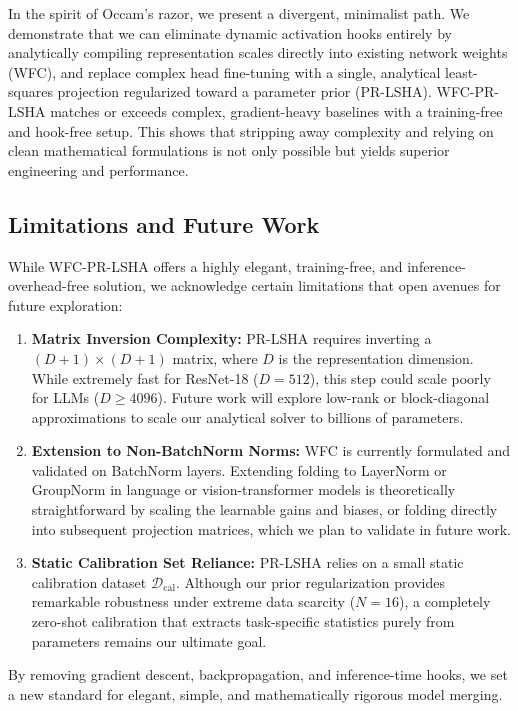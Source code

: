 \documentclass{article}
\theoremstyle{plain}
\theoremstyle{definition}
\theoremstyle{remark}
\begin{document}
In the spirit of Occam's razor, we present a divergent, minimalist path. We demonstrate that we can eliminate dynamic activation hooks entirely by analytically compiling representation scales directly into existing network weights (WFC), and replace complex head fine-tuning with a single, analytical least-squares projection regularized toward a parameter prior (PR-LSHA). WFC-PR-LSHA matches or exceeds complex, gradient-heavy baselines with a training-free and hook-free setup. This shows that stripping away complexity and relying on clean mathematical formulations is not only possible but yields superior engineering and performance.

\subsection{Limitations and Future Work}
\label{sec:limitations}
While WFC-PR-LSHA offers a highly elegant, training-free, and inference-overhead-free solution, we acknowledge certain limitations that open avenues for future exploration:
\begin{enumerate}
    \item \textbf{Matrix Inversion Complexity:} PR-LSHA requires inverting a $(D+1) \times (D+1)$ matrix, where $D$ is the representation dimension. While extremely fast for ResNet-18 ($D=512$), this step could scale poorly for LLMs ($D \ge 4096$). Future work will explore low-rank or block-diagonal approximations to scale our analytical solver to billions of parameters.
    \item \textbf{Extension to Non-BatchNorm Norms:} WFC is currently formulated and validated on BatchNorm layers. Extending folding to LayerNorm or GroupNorm in language or vision-transformer models is theoretically straightforward by scaling the learnable gains and biases, or folding directly into subsequent projection matrices, which we plan to validate in future work.
    \item \textbf{Static Calibration Set Reliance:} PR-LSHA relies on a small static calibration dataset $\mathcal{D}_{\text{cal}}$. Although our prior regularization provides remarkable robustness under extreme data scarcity ($N=16$), a completely zero-shot calibration that extracts task-specific statistics purely from parameters remains our ultimate goal.
\end{enumerate}

By removing gradient descent, backpropagation, and inference-time hooks, we set a new standard for elegant, simple, and mathematically rigorous model merging.



\end{document}
